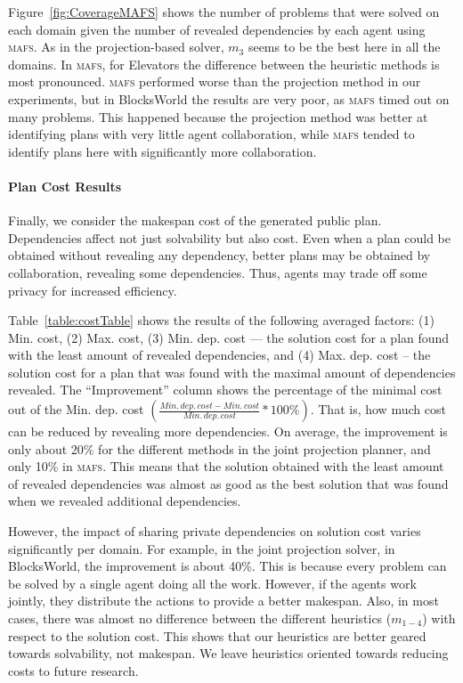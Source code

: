 \documentclass{article}
\newcommand{\mafs}{\textsc {mafs}\xspace}
\theoremstyle{remark}
\begin{document}
Figure~\ref{fig:CoverageMAFS} shows the number of problems that were solved on each domain given the number of revealed dependencies by each agent using \mafs.  As in the projection-based solver, $m_3$ seems to be the best here in all the domains.
In \mafs, for Elevators the difference between the heuristic methods is most pronounced.
\mafs performed worse than the projection method in our experiments, but in BlocksWorld the results are very poor, as \mafs timed out on many problems. This happened because the projection method was better at identifying plans with very little agent collaboration, while \mafs tended to identify plans here with significantly more collaboration.


\paragraph{Plan Cost Results}

Finally, we consider the makespan cost of the generated public plan. Dependencies affect not just solvability but also cost. Even when a plan could be obtained without revealing any dependency, better plans may be obtained by collaboration, revealing some dependencies. Thus, agents may  trade off some privacy for increased efficiency.

Table~\ref{table:costTable} shows the results of the following averaged factors: (1) Min. cost, (2) Max. cost, (3) Min. dep. cost --- the solution cost for a plan found with the least amount of revealed dependencies, 
and (4) Max. dep. cost -- the solution cost for a plan that was found with the maximal amount of dependencies revealed.
The ``Improvement'' column  shows  the percentage of the minimal cost out of the Min. dep. cost $(\frac{Min. \, dep. \, cost - Min. \, cost}{Min. \, dep. \, cost}*100\%)$. That is, how much cost can be reduced by revealing more dependencies. 
On average, the improvement is only about 20\% for the different methods in the joint projection planner, and only 10\% in \mafs. This means that the solution obtained with the least amount of revealed dependencies was almost as good as the best solution that was found when we revealed additional dependencies.

However, the impact of sharing private dependencies on solution cost varies significantly per domain. 
For example, in the joint projection solver, in BlocksWorld, the improvement is about 40\%. This is because every problem can be solved by a single agent doing all the work. However, if the agents work jointly, they distribute the actions to provide a better makespan. 
Also, in most cases, there was almost no difference between the different heuristics ($m_{1-4}$) with respect to the solution cost. This shows that our heuristics are better geared towards solvability, not makespan. We leave heuristics oriented towards reducing costs to future research.
\end{document}
